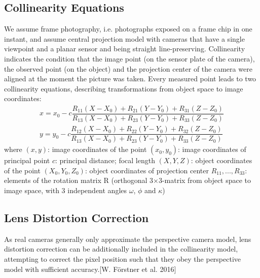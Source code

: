 \subsection{Collinearity Equations}
\label{subsec:Collinearity}
We assume frame photography, i.e. photographs exposed on a frame chip in one instant, and assume central projection model with cameras that have a single viewpoint and a planar sensor and being straight line-preserving. Collinearity indicates the condition that the image point (on the sensor plate of the camera), the observed point (on the object) and the projection center of the camera were aligned at the moment the picture was taken. Every measured point leads to two collinearity equations, describing transformations from object space to image coordinates:
\begin{equation} \label{eq:collinearity}
\begin{split}
x = x_0 -c \dfrac {R_{11}(X-X_0) + R_{21}(Y-Y_0) + R_{31}(Z-Z_0)} {R_{13}(X-X_0) + R_{23}(Y-Y_0) + R_{33}(Z-Z_0)} \\
y = y_0 -c \dfrac {R_{12}(X-X_0) + R_{22}(Y-Y_0) + R_{32}(Z-Z_0)} {R_{13}(X-X_0) + R_{23}(Y-Y_0) + R_{33}(Z-Z_0)}
\end{split}
\end{equation}
where\newline
$(x, y)$: image coordinates of the point \newline
$(x_0, y_0)$: image coordinates of principal point \newline
$c$: principal distance; focal length \newline
$(X, Y, Z)$: object coordinates of the point \newline
$(X_0, Y_0, Z_0)$: object coordinates of projection center \newline
$R_{11},...,R_{33}$: elements of the rotation matrix R (orthogonal 3$\times$3-matrix from object space to image space, with 3 independent angles $\omega$, $\phi$ and $\kappa$)

\subsection{Lens Distortion Correction}
\label{subsec:LensDistortion}

As real cameras generally only approximate the perspective camera model, lens distortion correction can be additionally included in the collinearity model, attempting to correct the pixel position such that they obey the perspective model with sufficient accuracy.[W. Förstner et al. 2016] 

